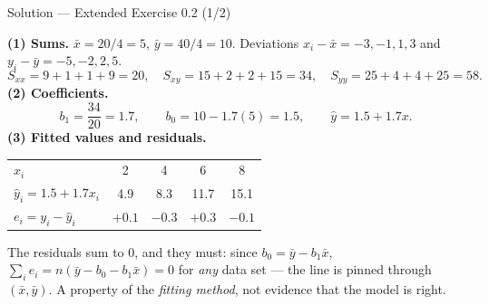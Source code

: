 \documentclass[aspectratio=169,11pt]{beamer}
\begin{document}
\begin{frame}{Solution --- Extended Exercise 0.2 (1/2)}
  \begin{solutionbox}
    \textbf{(1) Sums.} $\bar x = 20/4 = 5$, $\bar y = 40/4 = 10$.
    Deviations $x_i - \bar x = -3,-1,1,3$ and $y_i - \bar y = -5,-2,2,5$.
    \[
      S_{xx} = 9+1+1+9 = 20, \quad
      S_{xy} = 15+2+2+15 = 34, \quad
      S_{yy} = 25+4+4+25 = 58 .
    \]
    \textbf{(2) Coefficients.}
    \[
      b_1 = \frac{34}{20} = 1.7,
      \qquad
      b_0 = 10 - 1.7(5) = 1.5,
      \qquad
      \hat y = 1.5 + 1.7x .
    \]
    \textbf{(3) Fitted values and residuals.}
    \begin{center}\scriptsize
    \begin{tabular}{@{}lcccc@{}}
      \toprule
      $x_i$ & 2 & 4 & 6 & 8 \\
      $\hat y_i = 1.5+1.7x_i$ & 4.9 & 8.3 & 11.7 & 15.1 \\
      $e_i = y_i - \hat y_i$ & $+0.1$ & $-0.3$ & $+0.3$ & $-0.1$ \\
      \bottomrule
    \end{tabular}
    \end{center}
    The residuals sum to $0$, and they must: since $b_0 = \bar y - b_1\bar x$,
    $\sum_i e_i = n(\bar y - b_0 - b_1 \bar x) = 0$ for \emph{any} data set
    --- the line is pinned through $(\bar x, \bar y)$. A property of the
    \emph{fitting method}, not evidence that the model is right.
  \end{solutionbox}
\end{frame}
\end{document}
